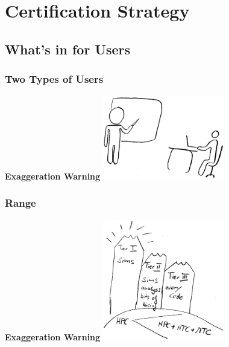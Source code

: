 \section[Certification Strategy]{Certification Strategy}

\subsection[What's in for Users]{What's in for Users}

\begin{frame}
  \frametitle{Two Types of Users}
  \centering
  {\bcattention \bf \large Exaggeration Warning \bcattention}\newline
  \includegraphics[width=0.4\textwidth]{images/users}
\end{frame}

\begin{frame}
  \frametitle{Range}
  \centering
  {\bcattention \bf \large Exaggeration Warning \bcattention}\newline
  \includegraphics[width=0.4\textwidth]{images/tier}
\end{frame}


